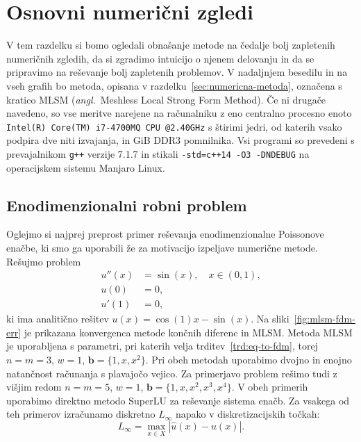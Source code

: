 \documentclass[12pt,a4paper,twoside]{article}
\theoremstyle{definition} %
\theoremstyle{plain} %
\numberwithin{equation}{section}
\renewcommand{\b}{\boldsymbol}
\newcommand{\ang}[1]{(\hspace{-1.5px}\textit{angl.}\ #1)}
\let\oldsection\section
\def\section{\cleardoublepage\oldsection}
\begin{document}
\section{Osnovni numerični zgledi}
\label{sec:osnovni-zgledi}
V tem razdelku si bomo ogledali obnašanje metode na čedalje bolj zapletenih numeričnih zgledih, da
si zgradimo intuicijo o njenem delovanju in da se pripravimo na reševanje bolj zapletenih problemov.
V nadaljnjem besedilu in na vseh grafih bo metoda, opisana v razdelku~\ref{sec:numericna-metoda},
označena s kratico MLSM \ang{Meshless Local Strong Form Method}. Če ni drugače navedeno, so vse
meritve narejene na računalniku z eno centralno procesno enoto
\verb|Intel(R) Core(TM) i7-4700MQ CPU @2.40GHz| s štirimi jedri, od katerih vsako podpira dve niti
izvajanja, in \unit[16]{GiB} DDR3 pomnilnika. Vsi programi so prevedeni s prevajalnikom \verb|g++|
verzije 7.1.7 in stikali \verb|-std=c++14 -O3 -DNDEBUG| na operacijskem sistemu Manjaro Linux.

\subsection{Enodimenzionalni robni problem}
Oglejmo si najprej preprost primer reševanja enodimenzionalne Poissonove enačbe, ki smo ga uporabili
že za motivacijo izpeljave numerične metode. Rešujmo problem
\begin{align}
  u''(x) &= \sin(x), \quad x \in (0, 1), \nonumber \\
  u(0) &= 0,  \\
  u'(1) &= 0, \nonumber
\end{align}
ki ima analitično rešitev $u(x) = \cos(1) x - \sin(x)$.
Na sliki~\ref{fig:mlsm-fdm-err} je prikazana konvergenca metode končnih diferenc
in MLSM. Metoda MLSM je uporabljena s parametri, pri katerih velja
trditev~\ref{trd:eq-to-fdm}, torej $n=m=3$, $w=1$, $\b b = \{1, x, x^2\}$.
Pri obeh metodah uporabimo dvojno in enojno natančnost računanja s plavajočo
vejico. Za primerjavo problem rešimo tudi z višjim redom $n=m=5$, $w=1$,
$\b b = \{1, x, x^2, x^3, x^4\}$. V obeh primerih uporabimo direktno metodo
SuperLU za reševanje sistema enačb. Za vsakega od teh primerov izračunamo
diskretno $L_\infty$ napako v diskretizacijskih točkah:
\begin{equation}
   L_\infty = \max_{x\in X} |\hat{u}(x) - u(x)|.
\end{equation}
\end{document}
